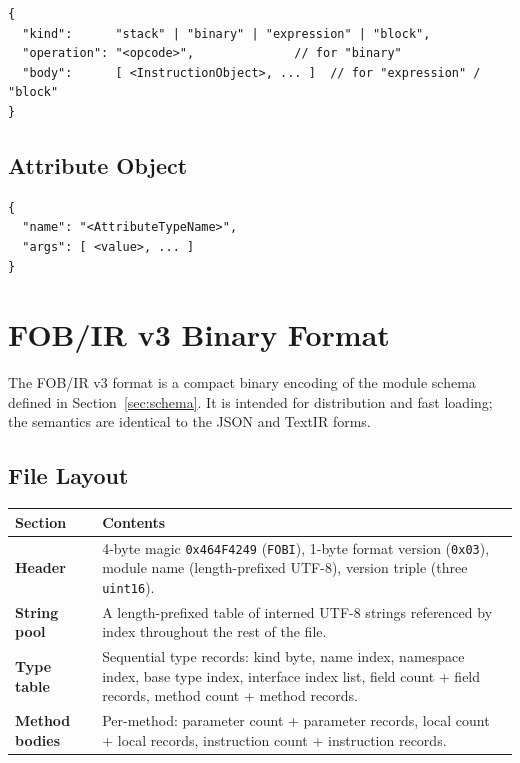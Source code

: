 \documentclass[11pt,a4paper]{article}
\begin{document}
\begin{lstlisting}[style=json]
{
  "kind":      "stack" | "binary" | "expression" | "block",
  "operation": "<opcode>",              // for "binary"
  "body":      [ <InstructionObject>, ... ]  // for "expression" / "block"
}
\end{lstlisting}

\subsection{Attribute Object}

\begin{lstlisting}[style=json]
{
  "name": "<AttributeTypeName>",
  "args": [ <value>, ... ]
}
\end{lstlisting}

\section{FOB/IR v3 Binary Format}
\label{sec:fob}

The FOB/IR v3 format is a compact binary encoding of the module schema
defined in Section~\ref{sec:schema}. It is intended for distribution and
fast loading; the semantics are identical to the JSON and TextIR forms.

\subsection{File Layout}

\begin{longtable}{lp{9cm}}
  \toprule
  \textbf{Section} & \textbf{Contents} \\
  \midrule
  \endhead
  \textbf{Header}        &
    4-byte magic \texttt{0x464F4249} (\texttt{FOBI}), 1-byte format
    version (\texttt{0x03}), module name (length-prefixed UTF-8), version
    triple (three \texttt{uint16}). \\
  \textbf{String pool}   &
    A length-prefixed table of interned UTF-8 strings referenced by index
    throughout the rest of the file. \\
  \textbf{Type table}    &
    Sequential type records: kind byte, name index, namespace index,
    base type index, interface index list, field count + field records,
    method count + method records. \\
  \textbf{Method bodies} &
    Per-method: parameter count + parameter records, local count + local
    records, instruction count + instruction records. \\
  \bottomrule
\end{longtable}
\end{document}
